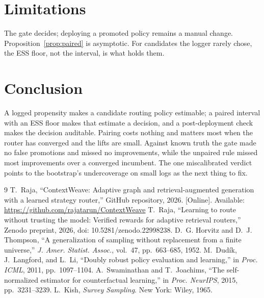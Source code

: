 \documentclass[conference]{IEEEtran}
\begin{document}
\section{Limitations}
The gate decides; deploying a promoted policy remains a manual change. Proposition~\ref{prop:paired} is asymptotic. For candidates the logger rarely chose, the ESS floor, not the interval, is what holds them.

\section{Conclusion}
A logged propensity makes a candidate routing policy estimable; a paired interval with an ESS floor makes that estimate a decision, and a post-deployment check makes the decision auditable. Pairing costs nothing and matters most when the router has converged and the lifts are small. Against known truth the gate made no false promotions and missed no improvements, while the unpaired rule missed most improvements over a converged incumbent. The one miscalibrated verdict points to the bootstrap's undercoverage on small logs as the next thing to fix.

\begin{thebibliography}{9}
 T.~Raja, ``ContextWeave: Adaptive graph and retrieval-augmented generation with a learned strategy router,'' GitHub repository, 2026. [Online]. Available: \url{https://github.com/rajatarun/ContextWeave}
 T.~Raja, ``Learning to route without trusting the model: Verified rewards for adaptive retrieval routers,'' Zenodo preprint, 2026, doi: 10.5281/zenodo.22998238.
 D.~G. Horvitz and D.~J. Thompson, ``A generalization of sampling without replacement from a finite universe,'' \emph{J. Amer. Statist. Assoc.}, vol.~47, pp.~663--685, 1952.
 M.~Dud{\'i}k, J.~Langford, and L.~Li, ``Doubly robust policy evaluation and learning,'' in \emph{Proc. ICML}, 2011, pp.~1097--1104.
 A.~Swaminathan and T.~Joachims, ``The self-normalized estimator for counterfactual learning,'' in \emph{Proc. NeurIPS}, 2015, pp.~3231--3239.
 L.~Kish, \emph{Survey Sampling}. New York: Wiley, 1965.
\end{thebibliography}
\end{document}
